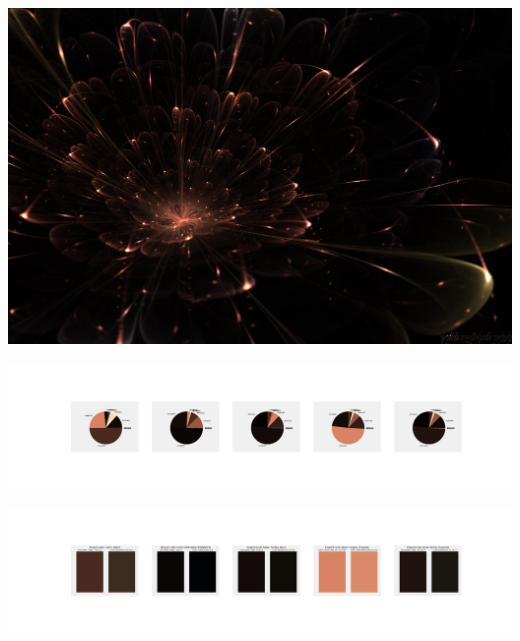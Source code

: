 \documentclass[11pt]{article}
\begin{document}
\begin{landscape}
    \begin{center}
    \includegraphics[width=\textwidth]{./nbimg/file (12).jpg}
    \end{center}

    \begin{center}
    \includegraphics[width=250mm]{./nbimg/pie-23.jpg}
    \end{center}

    \begin{center}
    \includegraphics[width=250mm]{./nbimg/peak-23.jpg}
    \end{center}
    


\end{landscape}
\end{document}
